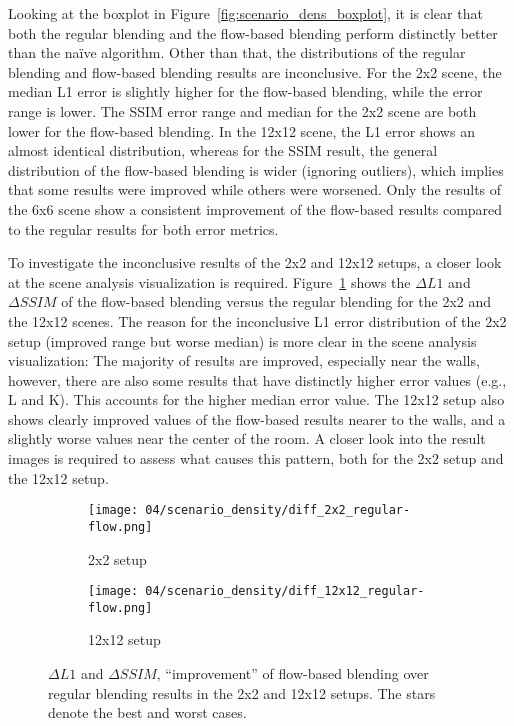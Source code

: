 Looking at the boxplot in Figure~\ref{fig:scenario_dens_boxplot}, it is clear that both the regular blending and the flow-based blending perform distinctly better than the na\"ive algorithm. Other than that, the distributions of the regular blending and flow-based blending results are inconclusive. For the 2x2 scene, the median L1 error is slightly higher for the flow-based blending, while the error range is lower. The SSIM error range and median for the 2x2 scene are both lower for the flow-based blending. In the 12x12 scene, the L1 error shows an almost identical distribution, whereas for the SSIM result, the general distribution of the flow-based blending is wider (ignoring outliers), which implies that some results were improved while others were worsened. Only the results of the 6x6 scene show a consistent improvement of the flow-based results compared to the regular results for both error metrics.

To investigate the inconclusive results of the 2x2 and 12x12 setups, a closer look at the scene analysis visualization is required. Figure~\ref{fig:dens_diff_2x2_12x12} shows the $\Delta L1$ and $\Delta SSIM$ of the flow-based blending versus the regular blending for the 2x2 and the 12x12 scenes. The reason for the inconclusive L1 error distribution of the 2x2 setup (improved range but worse median) is more clear in the scene analysis visualization: The majority of results are improved, especially near the walls, however, there are also some results that have distinctly higher error values (e.g., L and K). This accounts for the higher median error value. The 12x12 setup also shows clearly improved values of the flow-based results nearer to the walls, and a slightly worse values near the center of the room. A closer look into the result images is required to assess what causes this pattern, both for the 2x2 setup and the 12x12 setup.

\begin{figure}
\centering
    \hfill
    \begin{subfigure}[b]{0.4\textwidth}
            \centering
            \texttt{[image: 04/scenario\_density/diff\_2x2\_regular-flow.png]}
            \caption{2x2 setup}
    \end{subfigure}
    \hfill
    \begin{subfigure}[b]{0.4\textwidth}
            \centering
            \texttt{[image: 04/scenario\_density/diff\_12x12\_regular-flow.png]}
            \caption{12x12 setup}
    \end{subfigure}
    \hfill
  \caption[$\Delta L1$ and $\Delta SSIM$ in the 2x2 and 12x12 setups]{$\Delta L1$ and $\Delta SSIM$, ``improvement'' of flow-based blending over regular blending results in the 2x2 and 12x12 setups. The stars denote the best and worst cases.} \label{fig:dens_diff_2x2_12x12}
\end{figure}

